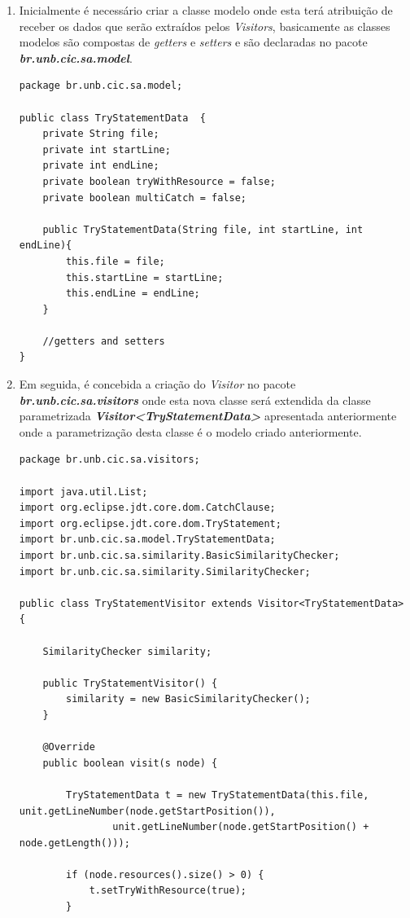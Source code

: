 	\begin{enumerate}
		\item Inicialmente é necessário criar a classe modelo onde esta terá atribuição de receber os dados que serão extraídos pelos \textit{Visitors}, basicamente as classes modelos são compostas de \textit{getters} e \textit{setters} e são declaradas no pacote  \textit{\textbf{br.unb.cic.sa.model}}.
			\begin{lstlisting}
package br.unb.cic.sa.model;

public class TryStatementData  {
	private String file;
	private int startLine;
	private int endLine;
	private boolean tryWithResource = false;
	private boolean multiCatch = false;
	
	public TryStatementData(String file, int startLine, int endLine){
		this.file = file;
		this.startLine = startLine;
		this.endLine = endLine;
	}
	
	//getters and setters
}
			\end{lstlisting}
			
			
		\item Em seguida, é concebida a criação do \textit{Visitor} no pacote \textit{\textbf{br.unb.cic.sa.visitors}} onde esta nova classe será extendida da classe parametrizada \textit{\textbf{Visitor<TryStatementData>}} apresentada anteriormente onde a parametrização desta classe é o modelo criado anteriormente.
			
			\begin{lstlisting}
package br.unb.cic.sa.visitors;

import java.util.List;
import org.eclipse.jdt.core.dom.CatchClause;
import org.eclipse.jdt.core.dom.TryStatement;
import br.unb.cic.sa.model.TryStatementData;
import br.unb.cic.sa.similarity.BasicSimilarityChecker;
import br.unb.cic.sa.similarity.SimilarityChecker;

public class TryStatementVisitor extends Visitor<TryStatementData> {

	SimilarityChecker similarity;

	public TryStatementVisitor() {
		similarity = new BasicSimilarityChecker();
	}

	@Override
	public boolean visit(s node) {

		TryStatementData t = new TryStatementData(this.file, unit.getLineNumber(node.getStartPosition()),
				unit.getLineNumber(node.getStartPosition() + node.getLength()));
		
		if (node.resources().size() > 0) {
			t.setTryWithResource(true);
		}
	

\end{lstlisting}
\end{enumerate}

